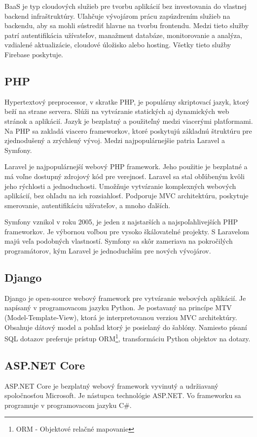 BaaS je typ cloudových služieb pre tvorbu aplikácií bez investovania do vlastnej backend infraštruktúry. Uľahčuje vývojárom prácu zapúzdrením služieb na backendu, aby sa mohli sústrediť hlavne na tvorbu frontendu. Medzi tieto služby patrí autentifikácia užívateľov, manažment databáze, monitorovanie a analýza, vzdialené aktualizácie, cloudové úložisko alebo hosting. Všetky tieto služby Firebase poskytuje. 

\subsection{PHP}
Hypertextový preprocessor\cite{php}, v skratke PHP, je populárny skriptovací jazyk, ktorý beží na strane servera. Slúži na vytváranie statických aj dynamických web stránok a aplikácií. Jazyk je bezplatný a použiteľný medzi viacerými platformami. Na PHP sa zakladá viacero frameworkov, ktoré poskytujú základnú štruktúru pre zjednodušený a zrýchlený vývoj. Medzi najpopulárnejšie patria Laravel a Symfony.

Laravel\cite{php} je najpopulárnejší webový PHP framework. Jeho použitie je bezplatné a má voľne dostupný zdrojový kód pre verejnosť. Laravel sa stal obľúbeným kvôli jeho rýchlosti a jednoduchosti. Umožňuje vytváranie komplexných webových aplikácií, bez ohľadu na ich rozsiahlosť. Podporuje MVC architektúru, poskytuje smerovanie, autentifikáciu užívateľov, a mnoho ďalších.

Symfony\cite{php} vznikol v roku 2005, je jeden z najstarších a najspoľahlivejších PHP frameworkov. Je výbornou voľbou pre vysoko škálovatelné projekty. S Laravelom majú veľa podobných vlastností. Symfony sa skôr zameriava na pokročilých programátorov, kým Laravel je jednoduchším pre nových vývojárov.

\subsection{Django}
Django je open-source webový framework pre vytváranie webových aplikácií. Je napísaný v programovacom jazyku Python. Je postavaný na princípe MTV (Model-Template-View), ktorá je interpretovanou verziou MVC architektúry. Obsahuje dátový model a pohľad ktorý je posielaný do šablóny. Namiesto písaní SQL dotazov preferuje prístup ORM\footnote{ORM - Objektové relačné mapovanie}, transformáciu Python objektov na dotazy.

\subsection{ASP.NET Core}
ASP.NET Core je bezplatný webový framework vyvinutý a udržiavaný spoločnosťou Microsoft. Je nástupca technológie ASP.NET. Vo frameworku sa programuje v programovacom jazyku C\#.

